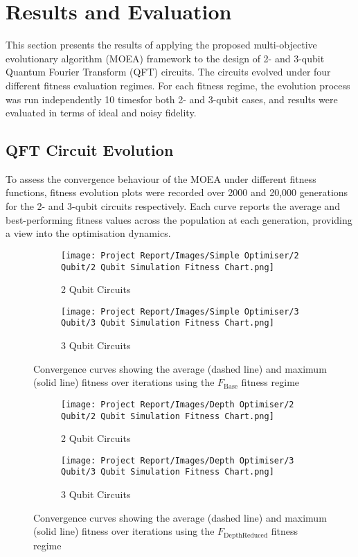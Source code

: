 \documentclass[11pt,a4paper]{article}
\begin{document}
\section{Results and Evaluation}\label{sec:results}
This section presents the results of applying the proposed multi-objective evolutionary algorithm (MOEA) framework to the design of 2- and 3-qubit Quantum Fourier Transform (QFT) circuits. The circuits evolved under four different fitness evaluation regimes. For each fitness regime, the evolution process was run independently 10 timesfor both 2- and 3-qubit cases, and results were evaluated in terms of ideal and noisy fidelity.

\subsection{QFT Circuit Evolution}
To assess the convergence behaviour of the MOEA under different fitness functions, fitness evolution plots were recorded over 2000 and 20,000 generations for the 2- and 3-qubit circuits respectively. Each curve reports the average and best-performing fitness values across the population at each generation, providing a view into the optimisation dynamics.

\begin{figure}[H]
\centering
\begin{subfigure}{.5\textwidth}
  \centering
  \texttt{[image: Project Report/Images/Simple Optimiser/2 Qubit/2 Qubit Simulation Fitness Chart.png]}
  \caption{2 Qubit Circuits}
  \label{fig:simple_fitness_2q}
\end{subfigure}%
\begin{subfigure}{.5\textwidth}
  \centering
  \texttt{[image: Project Report/Images/Simple Optimiser/3 Qubit/3 Qubit Simulation Fitness Chart.png]}
  \caption{3 Qubit Circuits}
  \label{fig:simple_fitness_3q}
\end{subfigure}
\caption{Convergence curves showing the average (dashed line) and maximum (solid line) fitness over iterations using the $F_{\mathrm{Base}}$ fitness regime}
\label{fig:simple_fitness_charts}
\end{figure}

\begin{figure}[H]
\centering
\begin{subfigure}{.5\textwidth}
  \centering
  \texttt{[image: Project Report/Images/Depth Optimiser/2 Qubit/2 Qubit Simulation Fitness Chart.png]}
  \caption{2 Qubit Circuits}
  \label{fig:depth_fitness_2q}
\end{subfigure}%
\begin{subfigure}{.5\textwidth}
  \centering
  \texttt{[image: Project Report/Images/Depth Optimiser/3 Qubit/3 Qubit Simulation Fitness Chart.png]}
  \caption{3 Qubit Circuits}
  \label{fig:depth_fitness_3q}
\end{subfigure}
\caption{Convergence curves showing the average (dashed line) and maximum (solid line) fitness over iterations using the $F_{\mathrm{DepthReduced}}$ fitness regime}
\label{fig:depth_fitness_charts}
\end{figure}
\end{document}
